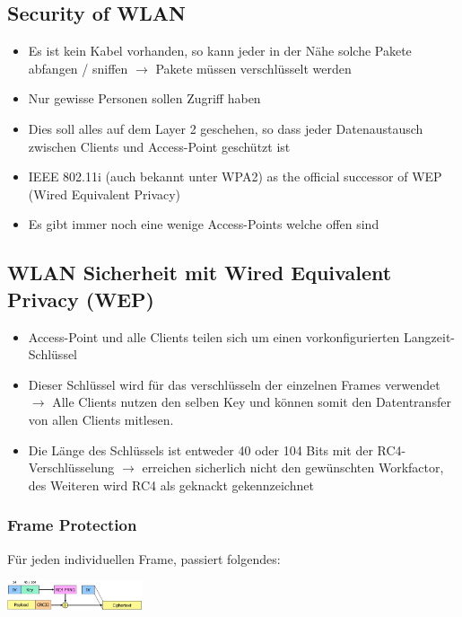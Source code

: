 \documentclass{report}
\newenvironment{Figure}
	{\par\medskip\noindent\minipage{\linewidth}}
	{\endminipage\par\medskip}
\theoremstyle{definition}
\theoremstyle{example}
\begin{document}
	\subsection{Security of WLAN}
\begin{itemize}
	\item Es ist kein Kabel vorhanden, so kann jeder in der Nähe solche Pakete abfangen / sniffen $\rightarrow$ Pakete müssen verschlüsselt werden
	\item Nur gewisse Personen sollen Zugriff haben
	\item Dies soll alles auf dem Layer 2 geschehen, so dass jeder Datenaustausch zwischen Clients und Access-Point geschützt ist
	\item IEEE 802.11i (auch bekannt unter WPA2) as the official successor of WEP (Wired Equivalent Privacy)
	\item Es gibt immer noch eine wenige Access-Points welche offen sind
\end{itemize}
	
	\subsection{WLAN Sicherheit mit Wired Equivalent Privacy (WEP)}
\begin{itemize}
	\item Access-Point und alle Clients teilen sich um einen vorkonfigurierten Langzeit-Schlüssel
	\item Dieser Schlüssel wird für das verschlüsseln der einzelnen Frames verwendet $\rightarrow$ Alle Clients nutzen den selben Key und können somit den Datentransfer von allen Clients mitlesen.
	\item Die Länge des Schlüssels ist entweder 40 oder 104 Bits mit der RC4-Verschlüsselung $\rightarrow$ erreichen sicherlich nicht den gewünschten Workfactor, des Weiteren wird RC4 als geknackt gekennzeichnet
\end{itemize}

		\subsubsection{Frame Protection}
Für jeden individuellen Frame, passiert folgendes:
\begin{Figure}
\centering
\includegraphics[width=150px]{img/FrameProtection.png}
	\label{fig:Frame Protection}
\end{Figure}
\end{document}
